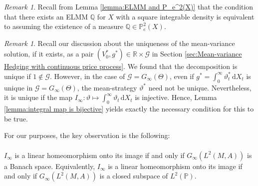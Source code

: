 \documentclass[11pt,a4paper,twoside,openany]{report}
\numberwithin{equation}{section}
\newcommand{\diff}{\mathrm{d}}
\theoremstyle{plain} %
\theoremstyle{definition} %
\theoremstyle{remark} %
\newtheorem{remark}[theorem]{Remark}
\begin{document}
\begin{remark}
    Recall from Lemma \ref{lemma:ELMM and P_e^2(X)} that the condition that there exists an ELMM \(\mathbb{Q}\) for \(X\) with a square integrable density is equivalent to assuming the existence of a measure \(\mathbb{Q}\in\mathbb{P}_e^2(X)\).
\end{remark}
\begin{remark}
    Recall our discussion about the uniqueness of the mean-variance solution, if it exists, as a pair \((V_0^*,g^*)\in\mathbb{R}\times\mathcal{G}\) in Section \ref{sec:Mean-variance Hedging with continuous price process}. We found that the decomposition is unique if \(1\notin\mathcal{G}\). However, in the case of \(\mathcal{G}=G_{\infty}(\Theta)\), even if \(g^*=\int_0^\infty\vartheta^*_t\,\diff X_t\) is unique in \(\mathcal{G}=G_{\infty}(\Theta)\), the mean-strategy \(\vartheta^*\) need not be unique. Nevertheless, it is unique if the map \(I_{\infty}:\vartheta\mapsto\int_0^\infty\vartheta_t\,\diff X_t\) is injective. Hence, Lemma \ref{lemma:integral map is bijective} yields exactly the necessary condition for this to be true. 
\end{remark}
For our purposes, the key observation is the following:
\\\\
      \(I_{\infty}\) is a linear homeomorphism onto its image if and only if \(G_{\infty}(L^2(M,A))\) is a Banach space. Equivalently, \(I_{\infty}\) is a linear homeomorphism onto its image if and only if \(G_{\infty}(L^2(M,A))\) is a closed subspace of \(L^2(\mathbb{P})\).
\\\\
\end{document}
